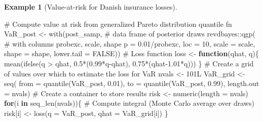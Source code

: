 \documentclass[
  11pt,
  letterpaper,
]{scrbook}
\newenvironment{Shaded}{\begin{snugshade}}{\end{snugshade}}
\newcommand{\AttributeTok}[1]{\textcolor[rgb]{0.40,0.45,0.13}{#1}}
\newcommand{\CommentTok}[1]{\textcolor[rgb]{0.37,0.37,0.37}{#1}}
\newcommand{\ConstantTok}[1]{\textcolor[rgb]{0.56,0.35,0.01}{#1}}
\newcommand{\ControlFlowTok}[1]{\textcolor[rgb]{0.00,0.23,0.31}{\textbf{#1}}}
\newcommand{\DecValTok}[1]{\textcolor[rgb]{0.68,0.00,0.00}{#1}}
\newcommand{\FloatTok}[1]{\textcolor[rgb]{0.68,0.00,0.00}{#1}}
\newcommand{\FunctionTok}[1]{\textcolor[rgb]{0.28,0.35,0.67}{#1}}
\newcommand{\NormalTok}[1]{\textcolor[rgb]{0.00,0.23,0.31}{#1}}
\newcommand{\OtherTok}[1]{\textcolor[rgb]{0.00,0.23,0.31}{#1}}
\newcommand{\SpecialCharTok}[1]{\textcolor[rgb]{0.37,0.37,0.37}{#1}}
\theoremstyle{definition}
\newtheorem{example}{Example}[chapter]
\theoremstyle{plain}
\theoremstyle{plain}
\theoremstyle{plain}
\theoremstyle{definition}
\theoremstyle{definition}
\theoremstyle{plain}
\theoremstyle{plain}
\theoremstyle{remark}
\begin{document}
\begin{example}[Value-at-risk for Danish insurance
losses]
\begin{Shaded}
\begin{Highlighting}[]
\CommentTok{\# Compute value at risk from generalized Pareto distribution quantile fn}
\NormalTok{VaR\_post }\OtherTok{\textless{}{-}} \FunctionTok{with}\NormalTok{(post\_samp,   }\CommentTok{\# data frame of posterior draws}
\NormalTok{            revdbayes}\SpecialCharTok{::}\FunctionTok{qgp}\NormalTok{(   }\CommentTok{\# with columns \textquotesingle{}probexc\textquotesingle{}, \textquotesingle{}scale\textquotesingle{}, \textquotesingle{}shape\textquotesingle{}}
  \AttributeTok{p =} \FloatTok{0.01}\SpecialCharTok{/}\NormalTok{probexc, }
  \AttributeTok{loc =} \DecValTok{10}\NormalTok{, }
  \AttributeTok{scale =}\NormalTok{ scale, }
  \AttributeTok{shape =}\NormalTok{ shape, }
  \AttributeTok{lower.tail =} \ConstantTok{FALSE}\NormalTok{))}
\CommentTok{\# Loss function}
\NormalTok{loss }\OtherTok{\textless{}{-}} \ControlFlowTok{function}\NormalTok{(qhat, q)\{}
    \FunctionTok{mean}\NormalTok{(}\FunctionTok{ifelse}\NormalTok{(q }\SpecialCharTok{\textgreater{}}\NormalTok{ qhat,}
           \FloatTok{0.5}\SpecialCharTok{*}\NormalTok{(}\FloatTok{0.99}\SpecialCharTok{*}\NormalTok{q}\SpecialCharTok{{-}}\NormalTok{qhat),}
           \FloatTok{0.75}\SpecialCharTok{*}\NormalTok{(qhat}\FloatTok{{-}1.01}\SpecialCharTok{*}\NormalTok{q)))}
\NormalTok{\}}
\CommentTok{\# Create a grid of values over which to estimate the loss for VaR}
\NormalTok{nvals }\OtherTok{\textless{}{-}} \DecValTok{101}\NormalTok{L}
\NormalTok{VaR\_grid }\OtherTok{\textless{}{-}} \FunctionTok{seq}\NormalTok{(}
  \AttributeTok{from =} \FunctionTok{quantile}\NormalTok{(VaR\_post, }\FloatTok{0.01}\NormalTok{),}
  \AttributeTok{to =} \FunctionTok{quantile}\NormalTok{(VaR\_post, }\FloatTok{0.99}\NormalTok{), }
  \AttributeTok{length.out =}\NormalTok{ nvals)}
\CommentTok{\# Create a container to store results}
\NormalTok{risk }\OtherTok{\textless{}{-}} \FunctionTok{numeric}\NormalTok{(}\AttributeTok{length =}\NormalTok{ nvals)}
\ControlFlowTok{for}\NormalTok{(i }\ControlFlowTok{in} \FunctionTok{seq\_len}\NormalTok{(nvals))\{}
  \CommentTok{\# Compute integral (Monte Carlo average over draws)}
\NormalTok{ risk[i] }\OtherTok{\textless{}{-}} \FunctionTok{loss}\NormalTok{(}\AttributeTok{q =}\NormalTok{ VaR\_post, }\AttributeTok{qhat =}\NormalTok{ VaR\_grid[i])}
\NormalTok{\}}
\end{Highlighting}
\end{Shaded}

\begin{figure}[ht!]


\end{figure}
\end{example}
\end{document}
